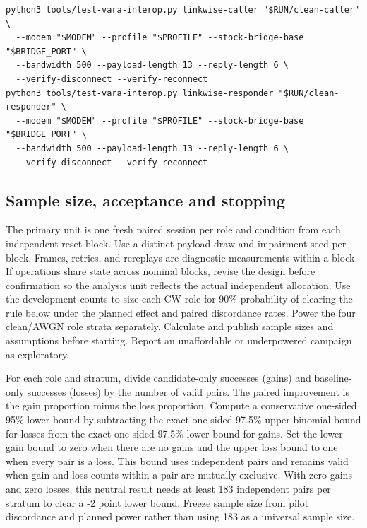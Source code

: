 \documentclass[11pt,a4paper]{article}
\begin{document}
\begin{lstlisting}
python3 tools/test-vara-interop.py linkwise-caller "$RUN/clean-caller" \
  --modem "$MODEM" --profile "$PROFILE" --stock-bridge-base "$BRIDGE_PORT" \
  --bandwidth 500 --payload-length 13 --reply-length 6 \
  --verify-disconnect --verify-reconnect
python3 tools/test-vara-interop.py linkwise-responder "$RUN/clean-responder" \
  --modem "$MODEM" --profile "$PROFILE" --stock-bridge-base "$BRIDGE_PORT" \
  --bandwidth 500 --payload-length 13 --reply-length 6 \
  --verify-disconnect --verify-reconnect
\end{lstlisting}
\subsection{Sample size, acceptance and stopping}
The primary unit is one fresh paired session per role and condition from each independent reset block. Use a distinct payload draw and impairment seed per block. Frames, retries, and rereplays are diagnostic measurements within a block. If operations share state across nominal blocks, revise the design before confirmation so the analysis unit reflects the actual independent allocation. Use the development counts to size each CW role for 90\% probability of clearing the rule below under the planned effect and paired discordance rates. Power the four clean/AWGN role strata separately. Calculate and publish sample sizes and assumptions before starting. Report an unaffordable or underpowered campaign as exploratory.

For each role and stratum, divide candidate-only successes (gains) and baseline-only successes (losses) by the number of valid pairs. The paired improvement is the gain proportion minus the loss proportion. Compute a conservative one-sided 95\% lower bound by subtracting the exact one-sided 97.5\% upper binomial bound for losses from the exact one-sided 97.5\% lower bound for gains. Set the lower gain bound to zero when there are no gains and the upper loss bound to one when every pair is a loss. This bound uses independent pairs and remains valid when gain and loss counts within a pair are mutually exclusive. With zero gains and zero losses, this neutral result needs at least 183 independent pairs per stratum to clear a -2 point lower bound. Freeze sample size from pilot discordance and planned power rather than using 183 as a universal sample size.
\end{document}
